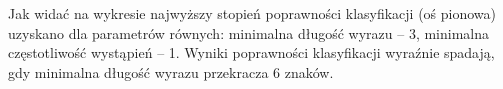 Jak widać na wykresie  
najwyższy stopień poprawności klasyfikacji (oś pionowa) uzyskano dla parametrów
równych: minimalna długość wyrazu -- 3, minimalna częstotliwość wystąpień -- 1.
Wyniki poprawności klasyfikacji wyraźnie spadają, gdy minimalna długość wyrazu
przekracza 6 znaków.

